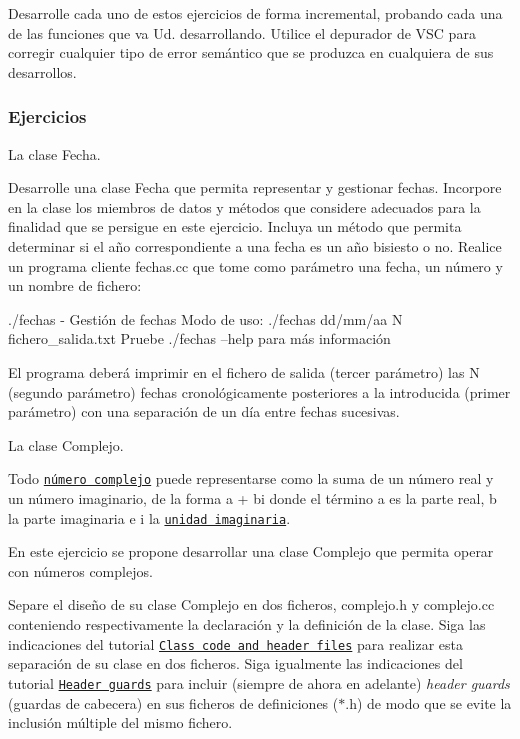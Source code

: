 Desarrolle cada uno de estos ejercicios de forma incremental, probando cada una de las funciones que va Ud. desarrollando. Utilice el depurador de V\+SC para corregir cualquier tipo de error semántico que se produzca en cualquiera de sus desarrollos.

\subsubsection*{Ejercicios}


\begin{DoxyEnumerate}
\item La clase Fecha.
\end{DoxyEnumerate}

Desarrolle una clase {\ttfamily Fecha} que permita representar y gestionar fechas. Incorpore en la clase los miembros de datos y métodos que considere adecuados para la finalidad que se persigue en este ejercicio. Incluya un método que permita determinar si el año correspondiente a una fecha es un año bisiesto o no. Realice un programa cliente {\ttfamily fechas.\+cc} que tome como parámetro una fecha, un número y un nombre de fichero\+: 
\begin{DoxyCode}
./fechas - Gestión de fechas
Modo de uso: ./fechas dd/mm/aa N fichero\_salida.txt
Pruebe ./fechas --help para más información
\end{DoxyCode}
 El programa deberá imprimir en el fichero de salida (tercer parámetro) las N (segundo parámetro) fechas cronológicamente posteriores a la introducida (primer parámetro) con una separación de un día entre fechas sucesivas.


\begin{DoxyEnumerate}
\item La clase Complejo.
\end{DoxyEnumerate}

Todo \href{https://es.wikipedia.org/wiki/N%C3%BAmero_complejo}{\tt número complejo} puede representarse como la suma de un número real y un número imaginario, de la forma {\ttfamily a + bi} donde el término {\ttfamily a} es la parte real, {\ttfamily b} la parte imaginaria e {\ttfamily i} la \href{https://es.wikipedia.org/wiki/Unidad_imaginaria}{\tt unidad imaginaria}.

En este ejercicio se propone desarrollar una clase {\ttfamily Complejo} que permita operar con números complejos.

Separe el diseño de su clase {\ttfamily Complejo} en dos ficheros, {\ttfamily complejo.\+h} y {\ttfamily complejo.\+cc} conteniendo respectivamente la declaración y la definición de la clase. Siga las indicaciones del tutorial \href{https://www.learncpp.com/cpp-tutorial/89-class-code-and-header-files/}{\tt Class code and header files} para realizar esta separación de su clase en dos ficheros. Siga igualmente las indicaciones del tutorial \href{https://www.learncpp.com/cpp-tutorial/header-guards/}{\tt Header guards} para incluir (siempre de ahora en adelante) {\itshape header guards} (guardas de cabecera) en sus ficheros de definiciones ({\ttfamily $\ast$.h}) de modo que se evite la inclusión múltiple del mismo fichero.

